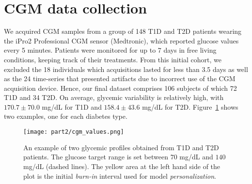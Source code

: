 \section{CGM data collection}
%


We acquired CGM samples from a group of 148 T1D and T2D patients wearing the iPro\textsuperscript{\footnotesize \textregistered}2 Professional CGM sensor (Medtronic), which reported glucose values every 5 minutes. Patients were monitored for up to 7 days in  free living conditions, keeping track of their treatments. %
From this initial cohort, we excluded the 18 individuals which acquisitions lasted for less than 3.5 days as well as the 24 time-series that presented artifacts due to incorrect use of the CGM acquisition device. Hence, our final dataset comprises 106 subjects of which 72 T1D and 34 T2D. 
On average, glycemic variability is relatively high, with $170.7\pm 70.0$ mg/dL for T1D and $158.4\pm 43.6$ mg/dL for T2D. Figure~\ref{fig:cgm} shows two examples, one for each diabetes type.

\begin{figure}
	\caption{An example of two glycemic profiles obtained from T1D and T2D patients. The glucose target range is set between $70$ mg/dL and $140$ mg/dL (dashed lines). The yellow area at the left hand side of the plot is the initial {\em burn-in} interval used for model {\em personalization}.}\label{fig:cgm}
	\centering
	\texttt{[image: part2/cgm\_values.png]}
\end{figure}

